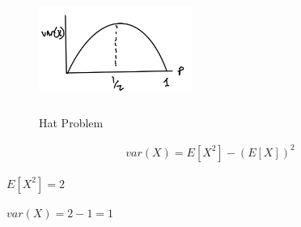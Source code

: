 
\begin{figure}[h]
\centering
\includegraphics[width=5cm, height=4cm]{images/L07/bin_hat_problem.jpeg}
\caption{Hat Problem}
\end{figure}


\begin{align*}
var(X) = E[X^2] - (E[X])^2
\end{align*}

$E[X^2]=2$

$var(X)=2-1=1$